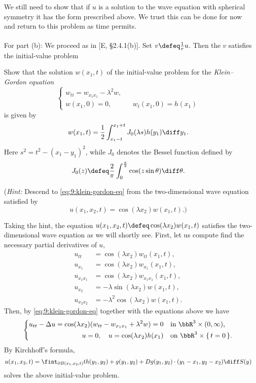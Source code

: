 \begin{solution}
  We still need to show that if \(u\) is a solution to the wave equation
  with spherical symmetry it has the form prescribed above. We trust this
  can be done for now and return to this problem as time permits.
  \\\\
  For part (b): We proceed as in [E, \S 2.4.1(b)]. Set
  \(v\defeq \frac{1}{r}u\). Then the \(v\) satisfies the initial-value
  problem
\end{solution}
\newpage

\begin{problem}
  Show that the solution \(w(x_1,t)\) of the initial-value problem for the
  \emph{Klein--Gordon equation}
  \begin{equation}
    \label{eq:9:klein-gordon-eq}
    \left\{
      \begin{aligned}
        w_{tt}=w_{x_1x_1}-\lambda^2w,\\
        w(x_1,0)=0,&&w_t(x_1,0)=h(x_1)
      \end{aligned}
    \right.
  \end{equation}
  is given by
  \[
    w(x_1,t)=\frac{1}{2}\int_{x_1-t}^{x_1+t}J_0(\lambda s) h(y_1)\diff y_1.
  \]
  Here \(s^2=t^2-(x_1-y_1)^2\), while \(J_0\) denotes the Bessel function
  defined by
  \[
    J_0(z)\defeq \frac{2}{\pi}\int_0^{\frac{\pi}{2}}\cos(z\sin\theta)\diff\theta.
  \]

  \noindent (\emph{Hint:} Descend to \eqref{eq:9:klein-gordon-eq} from the
  two-dimensional wave equation satisfied by
  \[
    u(x_1,x_2,t)=\cos(\lambda x_2)w(x_1,t).\text{)}
  \]
\end{problem}
\begin{solution}
  Taking the hint, the equation \(u(x_1,x_2,t)\defeq\cos(\lambda
  x_2)w(x_1,t)\) satisfies the two-dimensional wave equation as we will
  shortly see. First, let us compute find the necessary partial derivatives
  of \(u\),
  \begin{align*}
    u_{tt}&=\cos(\lambda x_2)w_{tt}(x_1,t),\\
    u_{x_1}&=\cos(\lambda x_2)w_{x_1}(x_1,t),\\
    u_{x_1x_1}&=\cos(\lambda x_2)w_{x_1x_1}(x_1,t),\\
    u_{x_2}&=-\lambda\sin(\lambda x_2)w(x_1,t),\\
    u_{x_2x_2}&=-\lambda^2\cos(\lambda x_2)w(x_1,t).
  \end{align*}
  Then, by \eqref{eq:9:klein-gordon-eq} together with the equations above
  we have
  \[
    \left\{
      \begin{aligned}
        u_{tt}-\Delta u=\cos(\lambda x_2)(w_{tt}-w_{x_1x_1}+\lambda^2 w)=0
        &&&\text{in \(\bbR^3\times(0,\infty)\),}\\
        u=0,\quad u=\cos(\lambda x_2)h(x_1)&&&\text{on
          \(\bbR^3\times\{\,t=0\,\}\).}
      \end{aligned}
    \right.
  \]
  By Kirchhoff's formula,
  \[
    u(x_1,x_2,t)=\fint_{\partial
      B(x_1,x_2,t)}th(y_1,y_2)+g(y_1,y_2)+Dg(y_1,y_2)\cdot(y_1-x_1,y_2-x_2)\diff S(y)
  \]
  solves the above initial-value problem.
\end{solution}
\newpage

